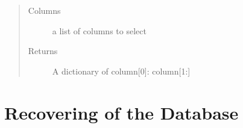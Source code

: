 \documentclass[letterpaper,10pt,english]{sphinxmanual}
\begin{document}
\begin{fulllineitems}
\begin{fulllineitems}
\begin{quote}
\begin{description}
\item[{Columns }] \leavevmode
a list of columns to select

\item[{Returns}] \leavevmode
A dictionary of column{[}0{]}: column{[}1:{]}

\end{description}\end{quote}

\end{fulllineitems}


\end{fulllineitems}



\chapter{Recovering of the Database}
\label{recover:recovering-of-the-database}\label{recover::doc}
\end{document}
